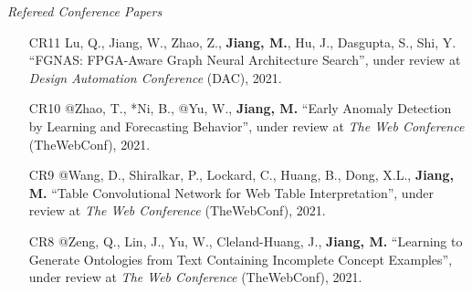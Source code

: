 \documentclass[10pt]{article}
\newenvironment{myindentpar}[1]%
{\begin{list}{}%
         {\setlength{\leftmargin}{#1}}%
         \item[]%
}
{\end{list}}
\newcounter{list}
\begin{document}
\begin{myindentpar}{0.00cm}

\vspace{.2cm}\hspace{-0.25cm}\textit{Refereed Conference Papers}

\begin{enumerate}[leftmargin=.5cm]
	

\item[CR11] Lu, Q., Jiang, W., Zhao, Z., \textbf{Jiang, M.}, Hu, J., Dasgupta, S., Shi, Y. ``FGNAS: FPGA-Aware Graph Neural Architecture Search'', under review at \textit{Design Automation Conference} (DAC), 2021.

\item[CR10] @Zhao, T., *Ni, B., @Yu, W., \textbf{Jiang, M.} ``Early Anomaly Detection by Learning and Forecasting Behavior'', under review at \textit{The Web Conference} (TheWebConf), 2021.

\item[CR9] @Wang, D., Shiralkar, P., Lockard, C., Huang, B., Dong, X.L., \textbf{Jiang, M.} ``Table Convolutional Network for Web Table Interpretation'', under review at \textit{The Web Conference} (TheWebConf), 2021.

\item[CR8] @Zeng, Q., Lin, J., Yu, W., Cleland-Huang, J., \textbf{Jiang, M.} ``Learning to Generate Ontologies from Text Containing Incomplete Concept Examples'', under review at \textit{The Web Conference} (TheWebConf), 2021.
	

\end{enumerate}
\end{myindentpar}
\end{document}
